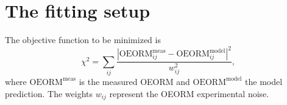 \documentclass[%
               ]{jacow}
\begin{document}
\section{The fitting setup}
The objective function to be minimized is
\begin{equation}
\chi^{2} = \sum\limits_{ij}\frac{|\text{OEORM}_{ij}^{\text{meas}} - \text{OEORM}_{ij}^{\text{model}}|^2}{w^2_{ij}},
\end{equation}
where $\text{OEORM}^{\text{meas}}$ is the measured OEORM and $\text{OEORM}^{\text{model}}$ the model prediction. The weights $w_{ij}$ represent the OEORM experimental noise.
\end{document}
